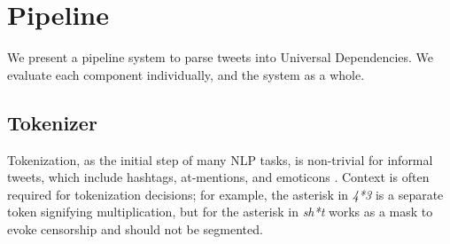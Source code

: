 \documentclass[11pt,a4paper]{article}
\begin{document}
%		



\section{Pipeline}
\label{sec:parsing}

We present a pipeline system to parse tweets into Universal
Dependencies.  We evaluate each component individually, and the system
as a whole.

\subsection{Tokenizer} \label{sec:tok}
Tokenization, as the initial step of many NLP tasks, is non-trivial for
informal tweets, which include hashtags, at-mentions, and emoticons
\cite{ICWSM101540}.  Context is often required for tokenization
decisions; for example,
the asterisk in {\it 4*3} is a separate token signifying
multiplication, but for the asterisk in {\it sh*t}
works as a mask to evoke censorship and should not be segmented.
\end{document}
